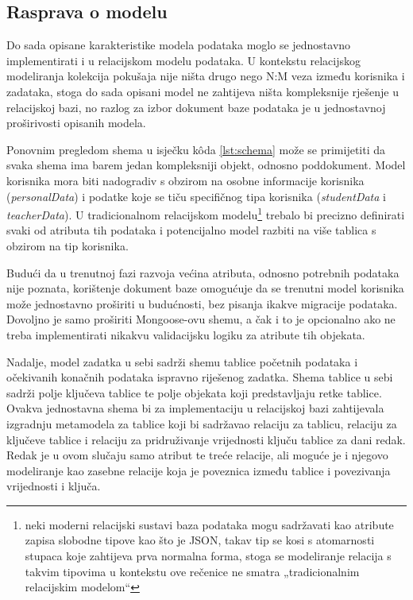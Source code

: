 \documentclass[times, utf8, diplomski, numeric]{fer}
\newcommand{\razmakp}{\vspace{18pt}}
\newcommand{\razmaks}{\vspace{10pt}}
\begin{document}
\razmaks
\subsection{Rasprava o modelu}

Do sada opisane karakteristike modela podataka moglo se jednostavno implementirati i u relacijskom modelu podataka.
U kontekstu relacijskog modeliranja kolekcija pokušaja nije ništa drugo nego N:M veza između korisnika i zadataka, stoga do sada opisani model ne zahtijeva ništa kompleksnije rješenje u relacijskoj bazi, no razlog za izbor dokument baze podataka je u jednostavnoj proširivosti opisanih modela.

\razmakp

Ponovnim pregledom shema u isječku kôda \ref{lst:schema} može se primijetiti da svaka shema ima barem jedan kompleksniji objekt, odnosno poddokument.
Model korisnika mora biti nadogradiv s obzirom na osobne informacije korisnika (\emph{personalData}) i podatke koje se tiču specifičnog tipa korisnika (\emph{studentData} i \emph{teacherData}).
U tradicionalnom relacijskom modelu\footnote{
    neki moderni relacijski sustavi baza podataka mogu sadržavati kao atribute zapisa slobodne tipove kao što je JSON, takav tip se kosi s atomarnosti stupaca koje zahtijeva prva normalna forma, stoga se modeliranje relacija s takvim tipovima u kontekstu ove rečenice ne smatra „tradicionalnim relacijskim modelom“
} trebalo bi precizno definirati svaki od atributa tih podataka i potencijalno model razbiti na više tablica s obzirom na tip korisnika.

Budući da u trenutnoj fazi razvoja većina atributa, odnosno potrebnih podataka nije poznata, korištenje dokument baze omogućuje da se trenutni model korisnika može jednostavno proširiti u budućnosti, bez pisanja ikakve migracije podataka.
Dovoljno je samo proširiti Mongoose-ovu shemu, a čak i to je opcionalno ako ne treba implementirati nikakvu validacijsku logiku za atribute tih objekata.

\razmakp

Nadalje, model zadatka u sebi sadrži shemu tablice početnih podataka i očekivanih konačnih podataka ispravno riješenog zadatka.
Shema tablice u sebi sadrži polje ključeva tablice te polje objekata koji predstavljaju retke tablice.
Ovakva jednostavna shema bi za implementaciju u relacijskoj bazi zahtijevala izgradnju metamodela za tablice koji bi sadržavao relaciju za tablicu, relaciju za ključeve tablice i relaciju za pridruživanje vrijednosti ključu tablice za dani redak.
Redak je u ovom slučaju samo atribut te treće relacije, ali moguće je i njegovo modeliranje kao zasebne relacije koja je poveznica između tablice i povezivanja vrijednosti i ključa.
\end{document}
